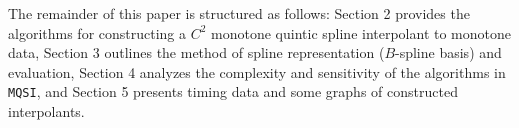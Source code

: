 The remainder of this paper is structured as follows: Section 2 provides
the algorithms for constructing a $C^2$ monotone quintic spline interpolant
to monotone data, Section 3 outlines the method of spline representation
($B$-spline basis) and evaluation, Section 4 analyzes the complexity and
sensitivity of the algorithms in {\tt MQSI}, and Section 5 presents 
timing data and some graphs of constructed interpolants.

